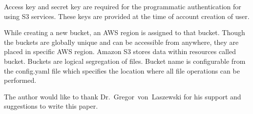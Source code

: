 Access key and secret key are required for the programmatic authentication for
using S3 services. These keys are provided at the time of account creation of
user.

While creating a new bucket, an AWS region is assigned to that bucket. Though
the buckets are globally unique and can be accessible from anywhere, they are
placed in specific AWS region.
Amazon S3 stores data within resources called bucket. Buckets are logical
segregation of files. Bucket name is configurable from the config.yaml file
which specifies the location where all file operations can be performed.


\begin{acks}

  The author would like to thank Dr.~Gregor~von~Laszewski for his
  support and suggestions to write this paper.

\end{acks}


 

